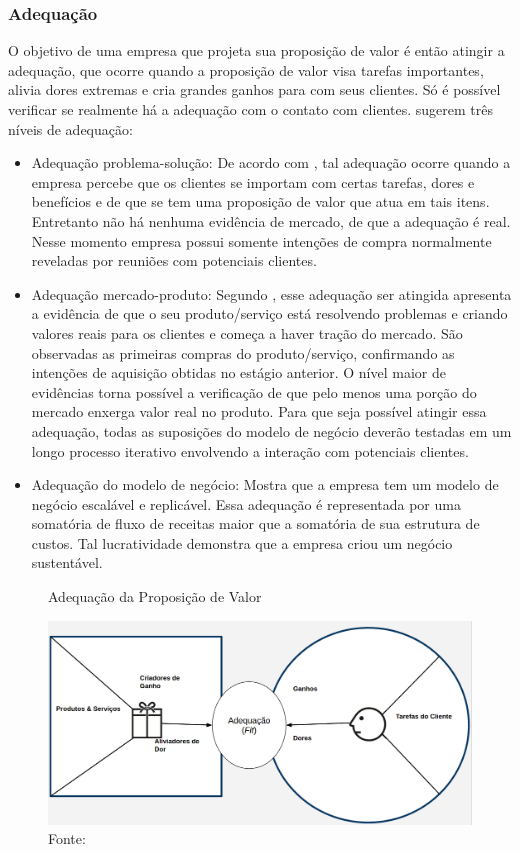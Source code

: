 \subsubsection{Adequação}
\label{cha:adequação}
O objetivo de uma empresa que projeta sua proposição de valor é então atingir a adequação, que ocorre quando a proposição de valor visa tarefas importantes, alivia dores extremas e cria grandes ganhos para com seus clientes. Só é possível verificar se realmente há a adequação com o contato com clientes.  sugerem três níveis de adequação:
\begin{itemize}
\item Adequação problema-solução: De acordo com , tal adequação ocorre quando a empresa percebe que os clientes se importam com certas tarefas, dores e benefícios e de que se tem uma proposição de valor que atua em tais itens. Entretanto não há nenhuma evidência de mercado, de que a adequação é real. Nesse momento empresa possui somente intenções de compra normalmente reveladas por reuniões com potenciais clientes.
\item Adequação mercado-produto: Segundo , esse adequação ser atingida apresenta a evidência de que o seu produto/serviço está resolvendo problemas e criando valores reais para os clientes e começa a haver tração do mercado. São observadas as primeiras compras do produto/serviço, confirmando as intenções de aquisição obtidas no estágio anterior. O nível maior de evidências torna possível a verificação de que pelo menos uma porção do mercado enxerga valor real no produto. Para que seja possível atingir essa adequação, todas as suposições do modelo de negócio deverão testadas em um longo processo iterativo envolvendo a interação com potenciais clientes.
\item Adequação do modelo de negócio: Mostra que a empresa tem um modelo de negócio escalável e replicável. Essa adequação é representada por uma somatória de fluxo de receitas maior que a somatória de sua estrutura de custos. Tal lucratividade demonstra que a empresa criou um negócio sustentável. \cite{valueproposition}
\end{itemize}

\begin{figure}[H]
\caption{Adequação da Proposição de Valor}
\centerline{\includegraphics[scale=0.25]{img/value_proposition_fit}}
\label{fig:value_proposition_fit}
\caption* {Fonte: }
\end{figure}